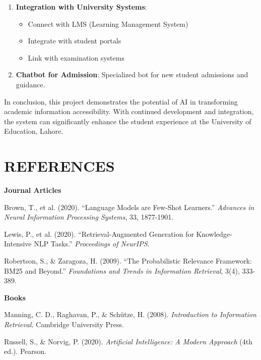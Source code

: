 \documentclass[12pt,a4paper]{book}
\numberwithin{table}{chapter}
\numberwithin{figure}{chapter}
\numberwithin{equation}{chapter}
\begin{document}
\begin{enumerate}
    \item \textbf{Integration with University Systems}:
    \begin{itemize}
        \item Connect with LMS (Learning Management System)
        \item Integrate with student portals
        \item Link with examination systems
    \end{itemize}

    \item \textbf{Chatbot for Admission}: Specialized bot for new student admissions and guidance.
\end{enumerate}

\bigskip
In conclusion, this project demonstrates the potential of AI in transforming academic information accessibility. With continued development and integration, the system can significantly enhance the student experience at the University of Education, Lahore.

\clearpage

\chapter{REFERENCES}

\bigskip
\textbf{Journal Articles}

\bigskip
[1] Brown, T., et al. (2020). ``Language Models are Few-Shot Learners.'' \textit{Advances in Neural Information Processing Systems}, 33, 1877-1901.

\bigskip
[2] Lewis, P., et al. (2020). ``Retrieval-Augmented Generation for Knowledge-Intensive NLP Tasks.'' \textit{Proceedings of NeurIPS}.

\bigskip
[3] Robertson, S., \& Zaragoza, H. (2009). ``The Probabilistic Relevance Framework: BM25 and Beyond.'' \textit{Foundations and Trends in Information Retrieval}, 3(4), 333-389.

\bigskip
\textbf{Books}

\bigskip
[4] Manning, C. D., Raghavan, P., \& Schütze, H. (2008). \textit{Introduction to Information Retrieval}. Cambridge University Press.

\bigskip
[5] Russell, S., \& Norvig, P. (2020). \textit{Artificial Intelligence: A Modern Approach} (4th ed.). Pearson.
\end{document}
